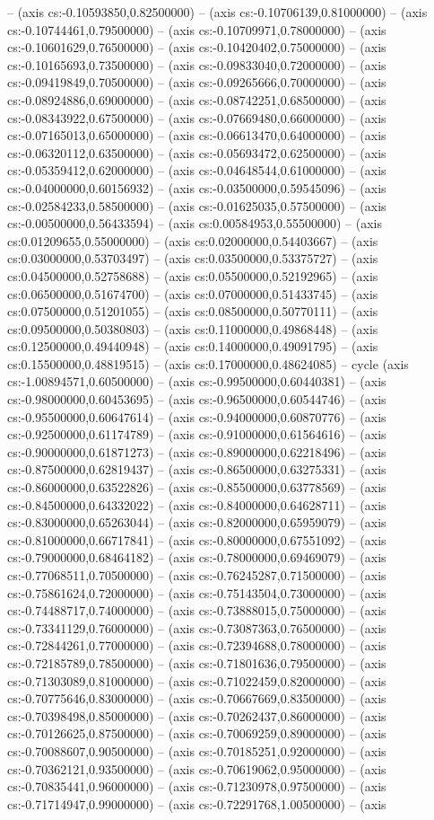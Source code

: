 -- (axis cs:-0.10593850,0.82500000) -- (axis cs:-0.10706139,0.81000000) -- (axis cs:-0.10744461,0.79500000) -- (axis cs:-0.10709971,0.78000000) -- (axis cs:-0.10601629,0.76500000) -- (axis cs:-0.10420402,0.75000000) -- (axis cs:-0.10165693,0.73500000) -- (axis cs:-0.09833040,0.72000000) -- (axis cs:-0.09419849,0.70500000) -- (axis cs:-0.09265666,0.70000000) -- (axis cs:-0.08924886,0.69000000) -- (axis cs:-0.08742251,0.68500000) -- (axis cs:-0.08343922,0.67500000) -- (axis cs:-0.07669480,0.66000000) -- (axis cs:-0.07165013,0.65000000) -- (axis cs:-0.06613470,0.64000000) -- (axis cs:-0.06320112,0.63500000) -- (axis cs:-0.05693472,0.62500000) -- (axis cs:-0.05359412,0.62000000) -- (axis cs:-0.04648544,0.61000000) -- (axis cs:-0.04000000,0.60156932) -- (axis cs:-0.03500000,0.59545096) -- (axis cs:-0.02584233,0.58500000) -- (axis cs:-0.01625035,0.57500000) -- (axis cs:-0.00500000,0.56433594) -- (axis cs:0.00584953,0.55500000) -- (axis cs:0.01209655,0.55000000) -- (axis cs:0.02000000,0.54403667) -- (axis cs:0.03000000,0.53703497) -- (axis cs:0.03500000,0.53375727) -- (axis cs:0.04500000,0.52758688) -- (axis cs:0.05500000,0.52192965) -- (axis cs:0.06500000,0.51674700) -- (axis cs:0.07000000,0.51433745) -- (axis cs:0.07500000,0.51201055) -- (axis cs:0.08500000,0.50770111) -- (axis cs:0.09500000,0.50380803) -- (axis cs:0.11000000,0.49868448) -- (axis cs:0.12500000,0.49440948) -- (axis cs:0.14000000,0.49091795) -- (axis cs:0.15500000,0.48819515) -- (axis cs:0.17000000,0.48624085) -- cycle (axis cs:-1.00894571,0.60500000) -- (axis cs:-0.99500000,0.60440381) -- (axis cs:-0.98000000,0.60453695) -- (axis cs:-0.96500000,0.60544746) -- (axis cs:-0.95500000,0.60647614) -- (axis cs:-0.94000000,0.60870776) -- (axis cs:-0.92500000,0.61174789) -- (axis cs:-0.91000000,0.61564616) -- (axis cs:-0.90000000,0.61871273) -- (axis cs:-0.89000000,0.62218496) -- (axis cs:-0.87500000,0.62819437) -- (axis cs:-0.86500000,0.63275331) -- (axis cs:-0.86000000,0.63522826) -- (axis cs:-0.85500000,0.63778569) -- (axis cs:-0.84500000,0.64332022) -- (axis cs:-0.84000000,0.64628711) -- (axis cs:-0.83000000,0.65263044) -- (axis cs:-0.82000000,0.65959079) -- (axis cs:-0.81000000,0.66717841) -- (axis cs:-0.80000000,0.67551092) -- (axis cs:-0.79000000,0.68464182) -- (axis cs:-0.78000000,0.69469079) -- (axis cs:-0.77068511,0.70500000) -- (axis cs:-0.76245287,0.71500000) -- (axis cs:-0.75861624,0.72000000) -- (axis cs:-0.75143504,0.73000000) -- (axis cs:-0.74488717,0.74000000) -- (axis cs:-0.73888015,0.75000000) -- (axis cs:-0.73341129,0.76000000) -- (axis cs:-0.73087363,0.76500000) -- (axis cs:-0.72844261,0.77000000) -- (axis cs:-0.72394688,0.78000000) -- (axis cs:-0.72185789,0.78500000) -- (axis cs:-0.71801636,0.79500000) -- (axis cs:-0.71303089,0.81000000) -- (axis cs:-0.71022459,0.82000000) -- (axis cs:-0.70775646,0.83000000) -- (axis cs:-0.70667669,0.83500000) -- (axis cs:-0.70398498,0.85000000) -- (axis cs:-0.70262437,0.86000000) -- (axis cs:-0.70126625,0.87500000) -- (axis cs:-0.70069259,0.89000000) -- (axis cs:-0.70088607,0.90500000) -- (axis cs:-0.70185251,0.92000000) -- (axis cs:-0.70362121,0.93500000) -- (axis cs:-0.70619062,0.95000000) -- (axis cs:-0.70835441,0.96000000) -- (axis cs:-0.71230978,0.97500000) -- (axis cs:-0.71714947,0.99000000) -- (axis cs:-0.72291768,1.00500000) -- (axis 